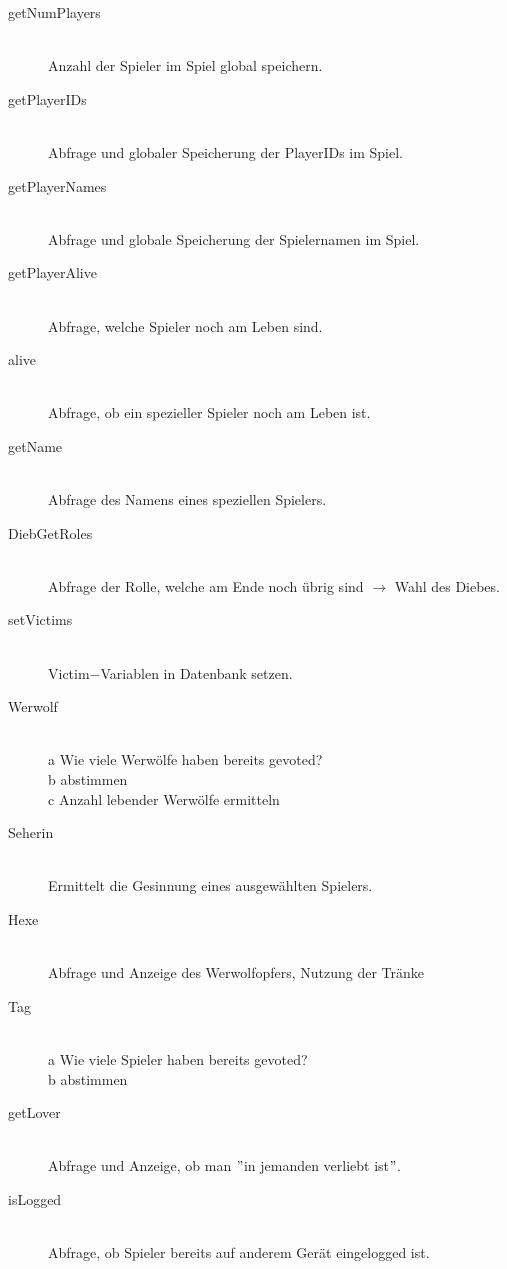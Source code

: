 \documentclass[12pt, a4paper]{article}
\begin{document}
\begin{description}
\item[getNumPlayers]\hfill \\
Anzahl der Spieler im Spiel global speichern.

\item[getPlayerIDs]\hfill \\
Abfrage und globaler Speicherung der PlayerIDs im Spiel.

\item[getPlayerNames]\hfill \\
Abfrage und globale Speicherung der Spielernamen im Spiel.

\item[getPlayerAlive]\hfill \\
Abfrage, welche Spieler noch am Leben sind.

\item[alive]\hfill \\
Abfrage, ob ein spezieller Spieler noch am Leben ist.

\item[getName]\hfill \\
Abfrage des Namens eines speziellen Spielers.

\item[DiebGetRoles]\hfill \\
Abfrage der Rolle, welche am Ende noch übrig sind $\rightarrow$ Wahl des Diebes.

\item[setVictims]\hfill \\
Victim$-$Variablen in Datenbank setzen.

\item[Werwolf]\hfill \\
a  Wie viele Werwölfe haben bereits gevoted?  \\
b  abstimmen \\
c  Anzahl lebender Werwölfe ermitteln

\item[Seherin]\hfill \\
Ermittelt die Gesinnung eines ausgewählten Spielers.

\item[Hexe]\hfill \\
Abfrage und Anzeige des Werwolfopfers, Nutzung der Tränke

\item[Tag]\hfill \\
a  Wie viele Spieler haben bereits gevoted? \\
b  abstimmen

\item[getLover]\hfill \\
Abfrage und Anzeige, ob man $"$in jemanden verliebt ist$"$.

\item[isLogged]\hfill \\
Abfrage, ob Spieler bereits auf anderem Gerät eingelogged ist.

\end{description}
\end{document}
